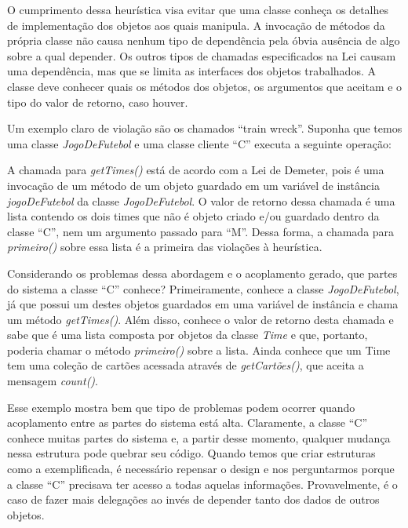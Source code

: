 O cumprimento dessa heurística visa evitar que uma classe conheça os detalhes de implementação dos objetos aos quais 
manipula. A invocação de métodos da própria classe não causa nenhum tipo de dependência pela óbvia ausência de algo 
sobre a qual depender. Os outros tipos de chamadas especificados na Lei causam uma dependência, mas que se limita as 
interfaces dos objetos trabalhados. A classe deve conhecer quais os métodos dos objetos, os argumentos que aceitam e o 
tipo do valor de retorno, caso houver.
	
Um exemplo claro de violação são os chamados ``train wreck''. Suponha que temos uma classe \textit{JogoDeFutebol} e uma classe 
cliente ``C'' executa a seguinte operação:
	


A chamada para \textit{getTimes()} está de acordo com a Lei de Demeter, pois é uma invocação de um método de um objeto guardado em um 
variável de instância \textit{jogoDeFutebol} da classe \textit{JogoDeFutebol}. O valor de retorno dessa chamada é uma lista contendo 
os dois times que não é objeto criado e/ou guardado dentro da classe ``C'', nem um argumento passado para ``M''. Dessa forma, a 
chamada para \textit{primeiro()} sobre essa lista é a primeira das violações à heurística.
	
Considerando os problemas dessa abordagem e o acoplamento gerado, que partes do sistema a classe ``C'' conhece? Primeiramente, 
conhece a classe \textit{JogoDeFutebol}, já que possui um destes objetos guardados em uma variável de instância e chama um método 
\textit{getTimes()}. Além disso, conhece o valor de retorno desta chamada e sabe que é uma lista composta por objetos da classe 
\textit{Time} e que, portanto, poderia chamar o método \textit{primeiro()} sobre a lista. Ainda conhece que um Time tem uma coleção 
de cartões acessada através de \textit{getCartões()}, que aceita a mensagem \textit{count()}.
	
Esse exemplo mostra bem que tipo de problemas podem ocorrer quando acoplamento entre as partes do sistema está alta. Claramente, a 
classe ``C'' conhece muitas partes do sistema e, a partir desse momento, qualquer mudança nessa estrutura pode quebrar seu código. 
Quando temos que criar estruturas como a exemplificada, é necessário repensar o design e nos perguntarmos porque a classe ``C'' 
precisava ter acesso a todas aquelas informações. Provavelmente, é o caso de fazer mais delegações ao invés de depender tanto dos 
dados de outros objetos.

